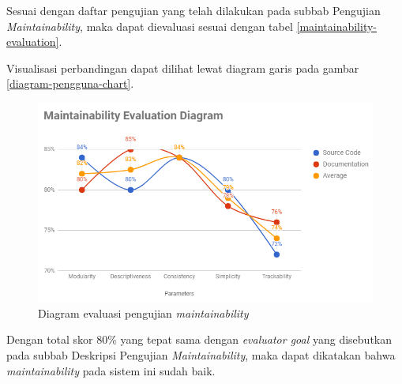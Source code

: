 Sesuai dengan daftar pengujian yang telah dilakukan pada subbab Pengujian \textit{Maintainability}, maka dapat dievaluasi sesuai dengan tabel \ref{maintainability-evaluation}.


Visualisasi perbandingan dapat dilihat lewat diagram garis pada gambar \ref{diagram-pengguna-chart}.

\begin{figure}[H]
	\centering
	\includegraphics[width=\textwidth]{images/bab5/maintainability/maintainability-evaluation.png}
	\caption{Diagram evaluasi pengujian \textit{maintainability}}
	\label{maintainability-diagram}
\end{figure}

Dengan total skor 80\% yang tepat sama dengan \textit{evaluator goal} yang disebutkan pada subbab Deskripsi Pengujian \textit{Maintainability}, maka dapat dikatakan bahwa \textit{maintainability} pada sistem ini sudah baik.